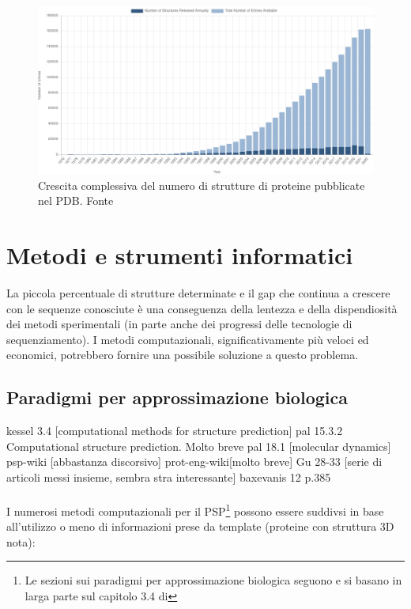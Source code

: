 \begin{figure}[!htb]
	\centering
	\includegraphics[scale=0.3]{images/pdb-statistica.png}
	\caption{Crescita complessiva del numero di strutture di proteine pubblicate nel PDB. Fonte\cite{pdbStats}}
	\label{fig:pdb-statistica}
\end{figure}


\section{Metodi e strumenti informatici}
La piccola percentuale di strutture determinate e il gap che continua a crescere con le sequenze conosciute è una conseguenza della lentezza e della dispendiosità dei metodi sperimentali (in parte anche dei progressi delle tecnologie di sequenziamento). I metodi computazionali, significativamente più veloci ed economici, potrebbero fornire una possibile soluzione a questo problema.

\subsection{Paradigmi per approssimazione biologica}
kessel 3.4 [computational methods for structure prediction]
pal 15.3.2 Computational structure prediction. Molto breve
pal 18.1 [molecular dynamics]
psp-wiki [abbastanza discorsivo]
prot-eng-wiki[molto breve]
Gu 28-33 [serie di articoli messi insieme, sembra stra interessante]
baxevanis 12 p.385 \\ \\

I numerosi metodi computazionali per il PSP\footnote{Le sezioni sui paradigmi per approssimazione biologica seguono e si basano in larga parte sul capitolo 3.4 di } possono essere suddivsi in base all'utilizzo o meno di informazioni prese da template (proteine con struttura 3D nota)\supercite{wei2019protein}:

